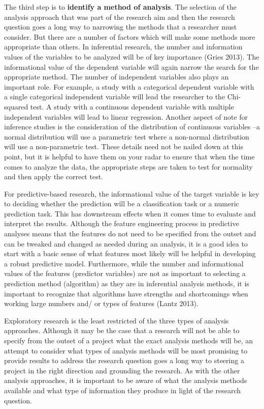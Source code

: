 \documentclass[
  letterpaper,
]{latex/krantz}
\begin{document}
The third step is to \textbf{identify a method of analysis}. The
selection of the analysis approach that was part of the research aim and
then the research question goes a long way to narrowing the methods that
a researcher must consider. But there are a number of factors which will
make some methods more appropriate than others. In inferential research,
the number and information values of the variables to be analyzed will
be of key importance (Gries 2013). The informational value of the
dependent variable will again narrow the search for the appropriate
method. The number of independent variables also plays an important
role. For example, a study with a categorical dependent variable with a
single categorical independent variable will lead the researcher to the
Chi-squared test. A study with a continuous dependent variable with
multiple independent variables will lead to linear regression. Another
aspect of note for inference studies is the consideration of the
distribution of continuous variables --a normal distribution will use a
parametric test where a non-normal distribution will use a
non-parametric test. These details need not be nailed down at this
point, but it is helpful to have them on your radar to ensure that when
the time comes to analyze the data, the appropriate steps are taken to
test for normality and then apply the correct test.

For predictive-based research, the informational value of the target
variable is key to deciding whether the prediction will be a
classification task or a numeric prediction task. This has downstream
effects when it comes time to evaluate and interpret the results.
Although the feature engineering process in predictive analyses means
that the features do not need to be specified from the outset and can be
tweaked and changed as needed during an analysis, it is a good idea to
start with a basic sense of what features most likely will be helpful in
developing a robust predictive model. Furthermore, while the number and
informational values of the features (predictor variables) are not as
important to selecting a prediction method (algorithm) as they are in
inferential analysis methods, it is important to recognize that
algorithms have strengths and shortcomings when working large numbers
and/ or types of features (Lantz 2013).

Exploratory research is the least restricted of the three types of
analysis approaches. Although it may be the case that a research will
not be able to specify from the outset of a project what the exact
analysis methods will be, an attempt to consider what types of analysis
methods will be most promising to provide results to address the
research question goes a long way to steering a project in the right
direction and grounding the research. As with the other analysis
approaches, it is important to be aware of what the analysis methods
available and what type of information they produce in light of the
research question.
\end{document}

